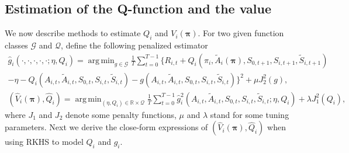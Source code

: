 \documentclass{article}
\DeclareMathOperator*{\argmin}{arg\,min}
\begin{document}
\subsection{Estimation of the Q-function and the value}\label{sec:Q}
We now describe methods to estimate $Q_i$ and $V_i(\bm{\pi})$. For two given function classes $\mathcal{G}$ and $\mathcal{Q}$, define the following penalized estimator
\begin{eqnarray*}
	\widehat{g}_{i}(\cdot,\cdot,\cdot,\cdot,\cdot;\eta,Q_i)=\argmin_{g\in \mathcal{G}}\frac{1}{T}\sum_{t=0}^{T-1} \{R_{i,t}+Q_{i}(\pi_i,\widetilde{A}_i(\bm{\pi}),S_{0,t+1},S_{i,t+1},\widetilde{S}_{i,t+1})\\
	-\eta-Q_i(A_{i,t},\widetilde{A}_{i,t},S_{0,t},S_{i,t},\widetilde{S}_{i,t})-g(A_{i,t},\widetilde{A}_{i,t},S_{0,t},S_{i,t},\widetilde{S}_{i,t})\}^2+\mu J_2^2(g),\\
	(\widehat{V}_i(\bm{\pi}),\widehat{Q}_i)=\argmin_{(\eta,Q_i)\in \mathbb{R}\times \mathcal{Q}}\frac{1}{T}\sum_{t=0}^{T-1} \widehat{g}_{i}^2(A_{i,t},\widetilde{A}_{i,t},S_{0,t},S_{i,t},\widetilde{S}_{i,t};\eta,Q_i)+\lambda J_1^2(Q_i),
\end{eqnarray*}
where $J_1$ and $J_2$ denote some penalty functions, $\mu$ and $\lambda$ stand for some tuning parameters. Next we derive the close-form expressions of 	$(\widehat{V}_i(\bm{\pi}),\widehat{Q}_i)$ when using RKHS to model $Q_i$ and $g_i$. %
\end{document}
